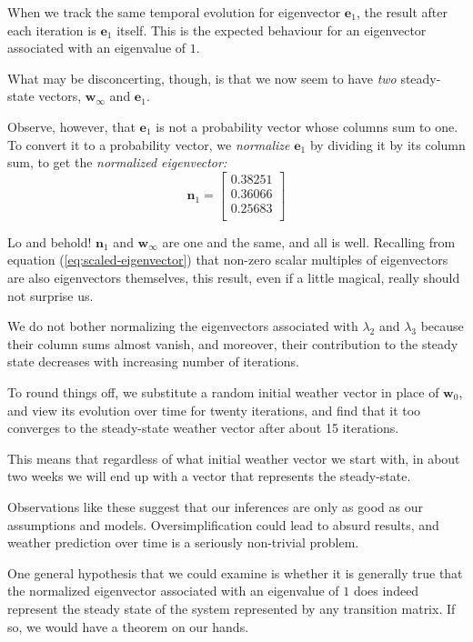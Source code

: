 \documentclass[
  12pt,
  a4paper,
]{article}
\begin{document}
When we track the same temporal evolution for eigenvector
\(\symbf{e}_{1}\), the result after each iteration is \(\symbf{e}_{1}\)
itself. This is the expected behaviour for an eigenvector associated
with an eigenvalue of \(1\).

What may be disconcerting, though, is that we now seem to have
\emph{two} steady-state vectors, \(\symbf{w}_{\infty}\) and
\(\symbf{e}_{1}\).

Observe, however, that \(\symbf{e}_{1}\) is not a probability vector
whose columns sum to one. To convert it to a probability vector, we
\emph{normalize} \(\symbf{e}_{1}\) by dividing it by its column sum, to
get the \emph{normalized eigenvector:} \begin{equation}
\symbf{n}_{1} = \begin{bmatrix}
0.38251\\
0.36066\\
0.25683\\
\end{bmatrix}
\label{eq:normalized-eigenvector-1}\end{equation}

Lo and behold! \(\symbf{n}_{1}\) and \(\symbf{w}_{\infty}\) are one and
the same, and all is well. Recalling from equation
(\ref{eq:scaled-eigenvector}) that non-zero scalar multiples of
eigenvectors are also eigenvectors themselves, this result, even if a
little magical, really should not surprise us.

We do not bother normalizing the eigenvectors associated with
\(\lambda_{2}\) and \(\lambda_{3}\) because their column sums almost
vanish, and moreover, their contribution to the steady state decreases
with increasing number of iterations.

To round things off, we substitute a random initial weather vector in
place of \(\symbf{w}_{0}\), and view its evolution over time for twenty
iterations, and find that it too converges to the steady-state weather
vector after about 15 iterations.

This means that regardless of what initial weather vector we start with,
in about two weeks we will end up with a vector that represents the
steady-state.

Observations like these suggest that our inferences are only as good as
our assumptions and models. Oversimplification could lead to absurd
results, and weather prediction over time is a seriously non-trivial
problem.

One general hypothesis that we could examine is whether it is generally
true that the normalized eigenvector associated with an eigenvalue of
\(1\) does indeed represent the steady state of the system represented
by any transition matrix. If so, we would have a theorem on our hands.
\end{document}

